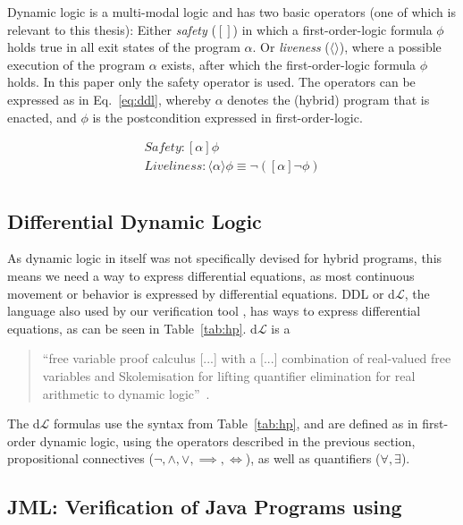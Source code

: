 Dynamic logic is a multi-modal logic and has two basic operators (one of which is relevant to this thesis): Either \textit{safety} (\([]\)) in which a first-order-logic formula \(\phi\) holds true in all exit states of the program \(\alpha\). Or \textit{liveness} (\(\langle\rangle\)), where a possible execution of the program \(\alpha\) exists, after which the first-order-logic formula \(\phi\) holds. In this paper only the safety operator is used. The operators can be expressed as in Eq.~\ref{eq:ddl}, whereby \(\alpha\) denotes the (hybrid) program that is enacted, and \(\phi\) is the postcondition expressed in first-order-logic.

\begin{equation}
	\begin{split}
		\mathit{Safety}: [\alpha]\phi \\
		Liveliness: \langle\alpha\rangle\phi \equiv \neg ([\alpha] \neg \phi) \\
	\end{split}
	\label{eq:ddl}
\end{equation}

\subsection{Differential Dynamic Logic}
\label{subsec:DDL}

As dynamic logic in itself was not specifically devised for hybrid programs, this means we need a way to express differential equations, as most continuous movement or behavior is expressed by differential equations. DDL or d\(\mathcal{L}\), the language also used by our verification tool \keym, has ways to express differential equations, as can be seen in Table~\ref{tab:hp}. d\(\mathcal{L}\) is a \begin{quote} ``free variable proof calculus [...] with a [...] combination of real-valued free variables and Skolemisation for lifting quantifier elimination for real arithmetic to dynamic logic''~\cite{PlatzerDl}.\end{quote}

The d\(\mathcal{L}\) formulas use the syntax from Table~\ref{tab:hp}, and are defined as in first-order dynamic logic, using the operators described in the previous section, propositional connectives (\(\neg, \wedge, \vee, \implies, \iff\)), as well as quantifiers (\(\forall, \exists\)).

\subsection{JML: Verification of Java Programs using \key}
\label{subsec:jml}

